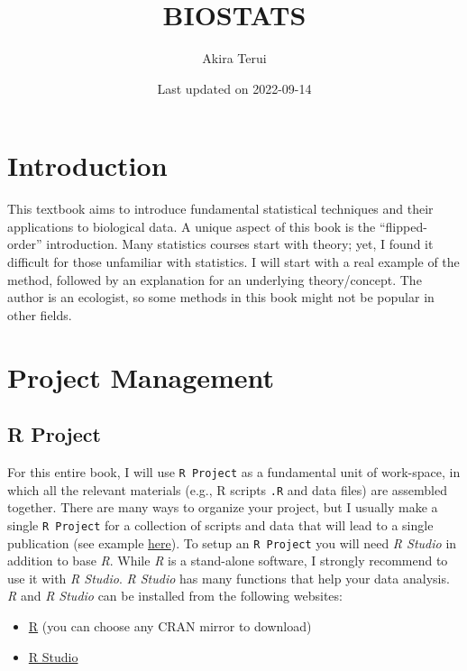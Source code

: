 \documentclass[
]{book}
\title{BIOSTATS}
\author{Akira Terui}
\date{Last updated on 2022-09-14}
\providecommand{\tightlist}{%
  \setlength{\itemsep}{0pt}\setlength{\parskip}{0pt}}
\begin{document}
\maketitle

{
\setcounter{tocdepth}{1}
\tableofcontents
}
\hypertarget{introduction}{%
\chapter{Introduction}\label{introduction}}

This textbook aims to introduce fundamental statistical techniques and their applications to biological data. A unique aspect of this book is the ``flipped-order'' introduction. Many statistics courses start with theory; yet, I found it difficult for those unfamiliar with statistics. I will start with a real example of the method, followed by an explanation for an underlying theory/concept. The author is an ecologist, so some methods in this book might not be popular in other fields.

\hypertarget{project-management}{%
\chapter{Project Management}\label{project-management}}

\hypertarget{r-project}{%
\section{R Project}\label{r-project}}

For this entire book, I will use \texttt{R\ Project} as a fundamental unit of work-space, in which all the relevant materials (e.g., R scripts \texttt{.R} and data files) are assembled together. There are many ways to organize your project, but I usually make a single \texttt{R\ Project} for a collection of scripts and data that will lead to a single publication (see example \href{https://github.com/aterui/public-proj_stream-diversity}{here}). To setup an \texttt{R\ Project} you will need \emph{R Studio} in addition to base \emph{R}. While \emph{R} is a stand-alone software, I strongly recommend to use it with \emph{R Studio}. \emph{R Studio} has many functions that help your data analysis. \emph{R} and \emph{R Studio} can be installed from the following websites:

\begin{itemize}
\tightlist
\item
  \href{https://www.r-project.org/}{R} (you can choose any CRAN mirror to download)
\item
  \href{https://rStudio.com/products/rStudio/download/}{R Studio}
\end{itemize}
\end{document}
